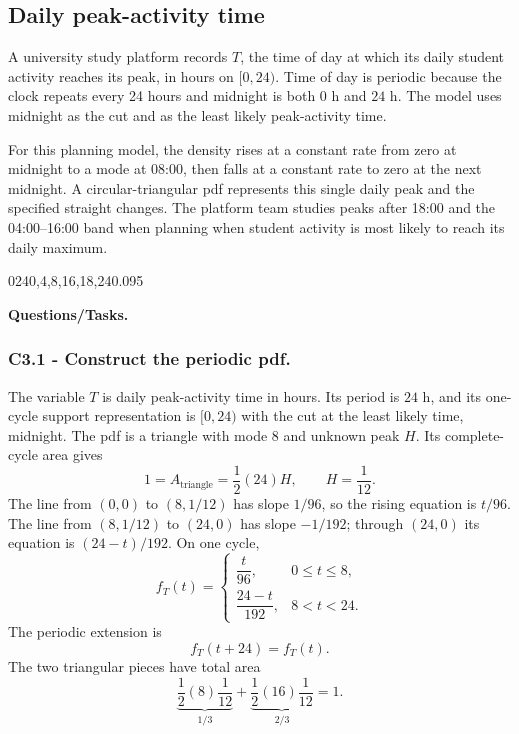 	\subsection{Daily peak-activity time}\label{sec:c3-triangular-activity}
	A university study platform records $T$, the time of day at which its daily
	student activity reaches its peak, in hours on $[0,24)$.  Time of day is
	periodic because the clock repeats every 24 hours and midnight is both $0$ h
	and $24$ h.  The model uses midnight as the cut and as the least likely
	peak-activity time.
	
	For this planning model, the density rises at a constant rate from zero at
	midnight to a mode at 08:00, then falls at a constant rate to zero at the next
	midnight.  A circular-triangular pdf represents this single daily peak and the
	specified straight changes.  The platform team studies peaks after 18:00 and
	the 04:00--16:00 band when planning when student activity is most likely to
	reach its daily maximum.
	
	\begingroup
	{0}{24}{0,4,8,16,18,24}{0.095}
	\endgroup
	
	\textbf{Questions/Tasks.}
	\begin{enumerate}
	\end{enumerate}
	
	\subsubsection*{C3.1 - Construct the periodic pdf.}
	\label{subsec:c3-triangular-activity-a}
	The variable $T$ is daily peak-activity time in hours.  Its period is $24$ h,
	and its one-cycle support representation is $[0,24)$ with the cut at the least
	likely time, midnight.  The pdf is a triangle with mode $8$ and unknown peak
	$H$.  Its complete-cycle area
	gives
	\[
	1=A_{\text{triangle}}=\frac12(24)H,\qquad H=\frac1{12}.
	\]
	The line from $(0,0)$ to $(8,1/12)$ has slope $1/96$, so the rising equation
	is $t/96$.  The line from $(8,1/12)$ to $(24,0)$ has slope $-1/192$; through
	$(24,0)$ its equation is $(24-t)/192$.  On one cycle,
	\[
	f_T(t)=
	\begin{cases}
		\dfrac{t}{96},&0\le t\le8,\\[2mm]
		\dfrac{24-t}{192},&8<t<24.
	\end{cases}
	\]
	The periodic extension is
	\[
	f_T(t+24)=f_T(t).
	\]
	The two triangular pieces have total area
	\[
	\underbrace{\frac12(8)\frac1{12}}_{1/3}
	+\underbrace{\frac12(16)\frac1{12}}_{2/3}=1.
	\]
	
